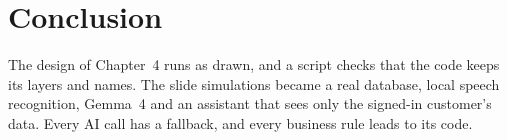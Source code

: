 \section{Conclusion}\label{sec:5.13}

The design of Chapter~4 runs as drawn, and a script checks that the code keeps its layers and names. The slide
simulations became a real database, local speech recognition, Gemma~4 and an assistant that sees only the signed-in
customer's data. Every AI call has a fallback, and every business rule leads to its code.
